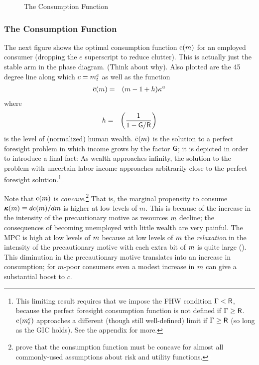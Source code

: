 \message{ !name(TractableBufferStock.tex)}\documentclass{handout}
\begin{document}
\begin{figure}
\caption{The Consumption Function}\label{fig:cFunc}
\end{figure}

\subsubsection{The Consumption Function}
The next figure shows the optimal consumption function $\mathrm{c}(m)$ for an
employed consumer (dropping the $e$ superscript to reduce clutter).  This
is actually just the stable arm in the phase diagram.  (Think about
why).  Also plotted are the 45 degree line along which $c = m^{e}_{t}$
as well as the function
\begin{eqnarray}
  \bar{\mathrm{c}}(m) & = & (m-1+h)\kappa^{u}
\end{eqnarray}
where
\begin{eqnarray}
  h & = & \left(\frac{1}{1-\mathsf{G}/\mathsf{R}}\right)
\end{eqnarray}
is the level of (normalized) human wealth.  $\bar{\mathrm{c}}(m)$ is the
solution to a perfect foresight problem in which income 
grows by the factor $\mathsf{G}$; it is depicted in order to
introduce a final fact: As wealth approaches infinity, the solution
to the problem with uncertain labor income approaches arbitrarily
close to the perfect foresight solution.\footnote{This
  limiting result requires that we impose the FHW condition 
  $\Gamma < \mathsf{R}$, because the perfect foresight consumption function is
  not defined if $\Gamma \geq \mathsf{R}$.  $\mathrm{c}(m^{e}_{t})$ approaches a
  different (though still well-defined) limit if $\Gamma \geq \mathsf{R}$ (so
  long as the GIC holds).  See the appendix for more.}

Note that $\mathrm{c}(m)$ is {\it concave}.\footnote{\cite{carroll&kimball:concavity} prove that the consumption
function must be concave for almost all commonly-used assumptions about
risk and utility functions.} That is, the marginal propensity to
consume $\pmb{\kappa}(m) \equiv d \mathrm{c}(m)/d m$ is higher at low levels of $m$.  This is because
of the increase in the intensity of the precautionary motive as resources
$m$ decline; the consequences of becoming unemployed with little wealth are very painful.  The MPC is high at low
levels of $m$ because at low levels of $m$ the {\it relaxation} in the
intensity of the precautionary motive with each extra bit of $m$ is quite large (\cite{kimball:smallandlarge}).
This diminution in the precautionary motive translates into an increase
in consumption; for $m$-poor consumers even a modest increase in $m$ can
give a substantial boost to $c$.
\end{document}
